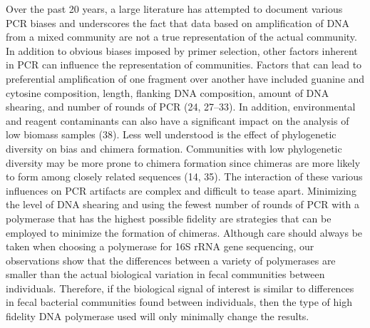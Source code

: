 \documentclass[11,]{article}
\begin{document}
Over the past 20 years, a large literature has attempted to document
various PCR biases and underscores the fact that data based on
amplification of DNA from a mixed community are not a true
representation of the actual community. In addition to obvious biases
imposed by primer selection, other factors inherent in PCR can influence
the representation of communities. Factors that can lead to preferential
amplification of one fragment over another have included guanine and
cytosine composition, length, flanking DNA composition, amount of DNA
shearing, and number of rounds of PCR (24, 27--33). In addition,
environmental and reagent contaminants can also have a significant
impact on the analysis of low biomass samples (38). Less well understood
is the effect of phylogenetic diversity on bias and chimera formation.
Communities with low phylogenetic diversity may be more prone to chimera
formation since chimeras are more likely to form among closely related
sequences (14, 35). The interaction of these various influences on PCR
artifacts are complex and difficult to tease apart. Minimizing the level
of DNA shearing and using the fewest number of rounds of PCR with a
polymerase that has the highest possible fidelity are strategies that
can be employed to minimize the formation of chimeras. Although care
should always be taken when choosing a polymerase for 16S rRNA gene
sequencing, our observations show that the differences between a variety
of polymerases are smaller than the actual biological variation in fecal
communities between individuals. Therefore, if the biological signal of
interest is similar to differences in fecal bacterial communities found
between individuals, then the type of high fidelity DNA polymerase used
will only minimally change the results.
\end{document}
